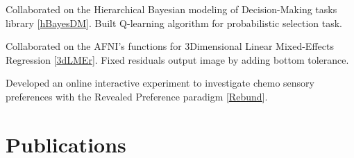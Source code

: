 \documentclass[]{plushcv}
\begin{document}
\begin{minipage}[t]{0.70\textwidth} 
\sectionsep
\sectionsep
\sectionsep
\sectionsep
\sectionsep
\sectionsep
\sectionsep
\sectionsep



\begin{tightemize}
\item Collaborated on the Hierarchical Bayesian modeling of Decision-Making tasks library [\href{https://github.com/CCS-Lab/hBayesDM}{\underline{hBayesDM}}]. Built Q-learning algorithm for probabilistic selection task.
\end{tightemize}
\sectionsep



\begin{tightemize}
\item Collaborated on the AFNI's functions for 3Dimensional Linear Mixed-Effects Regression [\href{https://github.com/afni/afni/blob/ebd2aef51c27cf7684f38f580e1db832b1ccf621/src/R_scripts/3dLMEr.R}{\underline{3dLMEr}}]. Fixed residuals output image by adding bottom tolerance.
\end{tightemize}

\begin{tightemize}
\item Developed an online interactive experiment to investigate chemo sensory preferences with the Revealed Preference paradigm [\href{https://github.com/munoztd0/Rebund}{\underline{Rebund}}].
\end{tightemize}
\sectionsep


\section{Publications} 


\sectionsep


\end{minipage}
\end{document}
